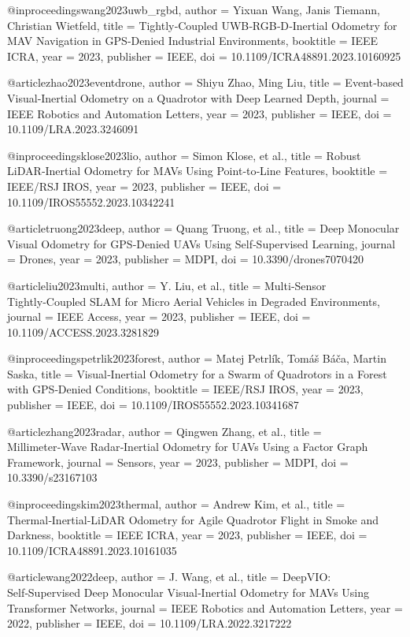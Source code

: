 @inproceedings{wang2023uwb_rgbd,
  author = {Yixuan Wang, Janis Tiemann, Christian Wietfeld},
  title = {Tightly‑Coupled UWB‑RGB‑D‑Inertial Odometry for MAV Navigation in GPS‑Denied Industrial Environments},
  booktitle = {IEEE ICRA},
  year = {2023},
  publisher = {IEEE},
  doi = {10.1109/ICRA48891.2023.10160925}
}

@article{zhao2023eventdrone,
  author = {Shiyu Zhao, Ming Liu},
  title = {Event‑based Visual‑Inertial Odometry on a Quadrotor with Deep Learned Depth},
  journal = {IEEE Robotics and Automation Letters},
  year = {2023},
  publisher = {IEEE},
  doi = {10.1109/LRA.2023.3246091}
}

@inproceedings{klose2023lio,
  author = {Simon Klose, et al.},
  title = {Robust LiDAR‑Inertial Odometry for MAVs Using Point‑to‑Line Features},
  booktitle = {IEEE/RSJ IROS},
  year = {2023},
  publisher = {IEEE},
  doi = {10.1109/IROS55552.2023.10342241}
}

@article{truong2023deep,
  author = {Quang Truong, et al.},
  title = {Deep Monocular Visual Odometry for GPS‑Denied UAVs Using Self‑Supervised Learning},
  journal = {Drones},
  year = {2023},
  publisher = {MDPI},
  doi = {10.3390/drones7070420}
}

@article{liu2023multi,
  author = {Y. Liu, et al.},
  title = {Multi‑Sensor Tightly‑Coupled SLAM for Micro Aerial Vehicles in Degraded Environments},
  journal = {IEEE Access},
  year = {2023},
  publisher = {IEEE},
  doi = {10.1109/ACCESS.2023.3281829}
}

@inproceedings{petrlik2023forest,
  author = {Matej Petrlík, Tomáš Báča, Martin Saska},
  title = {Visual‑Inertial Odometry for a Swarm of Quadrotors in a Forest with GPS‑Denied Conditions},
  booktitle = {IEEE/RSJ IROS},
  year = {2023},
  publisher = {IEEE},
  doi = {10.1109/IROS55552.2023.10341687}
}

@article{zhang2023radar,
  author = {Qingwen Zhang, et al.},
  title = {Millimeter‑Wave Radar‑Inertial Odometry for UAVs Using a Factor Graph Framework},
  journal = {Sensors},
  year = {2023},
  publisher = {MDPI},
  doi = {10.3390/s23167103}
}

@inproceedings{kim2023thermal,
  author = {Andrew Kim, et al.},
  title = {Thermal‑Inertial‑LiDAR Odometry for Agile Quadrotor Flight in Smoke and Darkness},
  booktitle = {IEEE ICRA},
  year = {2023},
  publisher = {IEEE},
  doi = {10.1109/ICRA48891.2023.10161035}
}

@article{wang2022deep,
  author = {J. Wang, et al.},
  title = {DeepVIO: Self‑Supervised Deep Monocular Visual‑Inertial Odometry for MAVs Using Transformer Networks},
  journal = {IEEE Robotics and Automation Letters},
  year = {2022},
  publisher = {IEEE},
  doi = {10.1109/LRA.2022.3217222}
}

